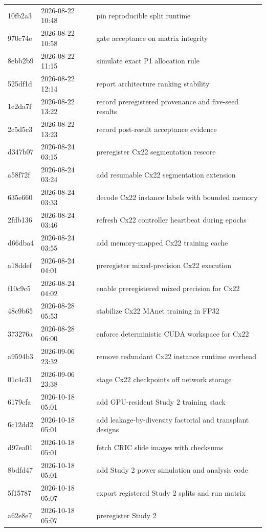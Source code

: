{\begin{longtable}{llp{11.2cm}}
10fb2a3 & 2026-08-22 10:48 & pin reproducible split runtime \\
970c74e & 2026-08-22 10:58 & gate acceptance on matrix integrity \\
8ebb2b9 & 2026-08-22 11:15 & simulate exact P1 allocation rule \\
525df1d & 2026-08-22 12:14 & report architecture ranking stability \\
1c2da7f & 2026-08-22 13:22 & record preregistered provenance and five-seed results \\
2c5d5c3 & 2026-08-22 13:23 & record post-result acceptance evidence \\
d347b07 & 2026-08-24 03:15 & preregister Cx22 segmentation rescore \\
a58f72f & 2026-08-24 03:24 & add resumable Cx22 segmentation extension \\
635e660 & 2026-08-24 03:33 & decode Cx22 instance labels with bounded memory \\
2fdb136 & 2026-08-24 03:46 & refresh Cx22 controller heartbeat during epochs \\
d66dba4 & 2026-08-24 03:55 & add memory-mapped Cx22 training cache \\
a18ddef & 2026-08-24 04:01 & preregister mixed-precision Cx22 execution \\
f10c9c5 & 2026-08-24 04:02 & enable preregistered mixed precision for Cx22 \\
48c9b65 & 2026-08-28 05:53 & stabilize Cx22 MAnet training in FP32 \\
373276a & 2026-08-28 06:00 & enforce deterministic CUDA workspace for Cx22 \\
a9594b3 & 2026-09-06 23:32 & remove redundant Cx22 instance runtime overhead \\
01c4c31 & 2026-09-06 23:38 & stage Cx22 checkpoints off network storage \\
6179cfa & 2026-10-18 05:01 & add GPU-resident Study 2 training stack \\
6c12dd2 & 2026-10-18 05:01 & add leakage-by-diversity factorial and transplant designs \\
d97ea01 & 2026-10-18 05:01 & fetch CRIC slide images with checksums \\
8bdfd47 & 2026-10-18 05:01 & add Study 2 power simulation and analysis code \\
5f15787 & 2026-10-18 05:07 & export registered Study 2 splits and run matrix \\
a62e8e7 & 2026-10-18 05:07 & preregister Study 2 \\

\end{longtable}}
